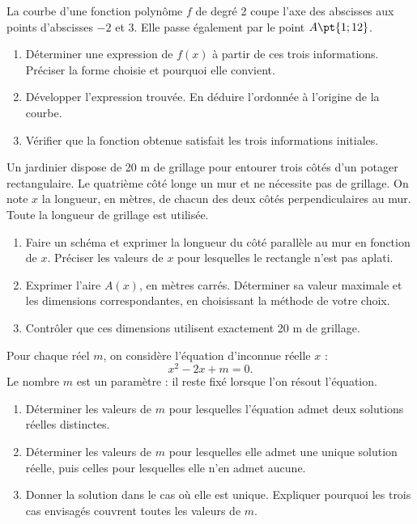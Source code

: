 La courbe d’une fonction polynôme $f$ de degré 2 coupe l’axe des abscisses aux points d’abscisses $-2$ et 3. Elle passe également par le point $A\pt{1;12}$.
\begin{enumerate}[label=\arabic*.]
\item Déterminer une expression de $f(x)$ à partir de ces trois informations. Préciser la forme choisie et pourquoi elle convient.
\item Développer l’expression trouvée. En déduire l’ordonnée à l’origine de la courbe.
\item Vérifier que la fonction obtenue satisfait les trois informations initiales.
\end{enumerate}
Un jardinier dispose de 20 m de grillage pour entourer trois côtés d’un potager rectangulaire. Le quatrième côté longe un mur et ne nécessite pas de grillage. On note $x$ la longueur, en mètres, de chacun des deux côtés perpendiculaires au mur. Toute la longueur de grillage est utilisée.
\begin{enumerate}[label=\arabic*.]
\item Faire un schéma et exprimer la longueur du côté parallèle au mur en fonction de $x$. Préciser les valeurs de $x$ pour lesquelles le rectangle n’est pas aplati.
\item Exprimer l’aire $A(x)$, en mètres carrés. Déterminer sa valeur maximale et les dimensions correspondantes, en choisissant la méthode de votre choix.
\item Contrôler que ces dimensions utilisent exactement 20 m de grillage.
\end{enumerate}
Pour chaque réel $m$, on considère l’équation d’inconnue réelle $x$ :\[x^2-2x+m=0.\]Le nombre $m$ est un paramètre : il reste fixé lorsque l’on résout l’équation.
\begin{enumerate}[label=\arabic*.]
\item Déterminer les valeurs de $m$ pour lesquelles l’équation admet deux solutions réelles distinctes.
\item Déterminer les valeurs de $m$ pour lesquelles elle admet une unique solution réelle, puis celles pour lesquelles elle n’en admet aucune.
\item Donner la solution dans le cas où elle est unique. Expliquer pourquoi les trois cas envisagés couvrent toutes les valeurs de $m$.
\end{enumerate}
